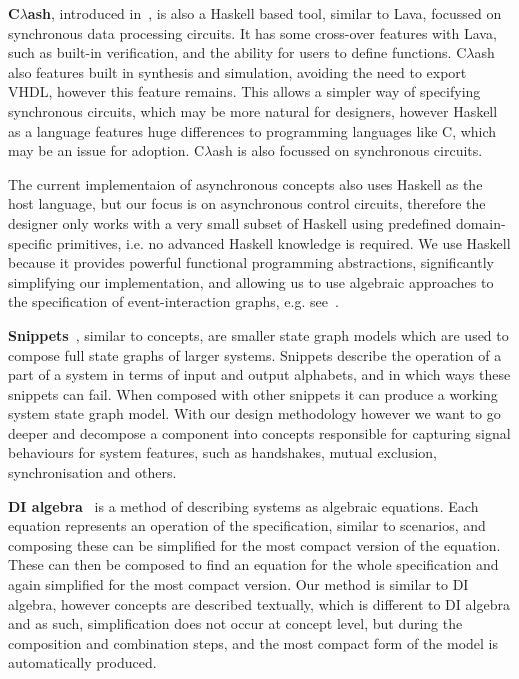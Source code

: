 \documentclass[british, journal]{IEEEtran}
\newcommand{\noun}[1]{\textsc{#1}}
\begin{document}
\textbf{C$\lambda$ash}, introduced in~\cite{baaij2009clambdaash},  is also a Haskell
based tool, similar to Lava, focussed on synchronous data processing circuits. It has some
cross-over features with Lava, such as built-in verification, and the ability for
users to define functions.
C$\lambda$ash also features built in synthesis and simulation, avoiding the need to export VHDL, however this feature remains. This allows a simpler way of
specifying synchronous circuits, which may be more natural for designers,
however Haskell as a language features huge differences to programming languages
like \noun{C}, which may be an issue for adoption. C$\lambda$ash is also focussed on synchronous circuits.

The current implementaion of asynchronous concepts also uses Haskell as the host language, but our focus is
on asynchronous control circuits, therefore the designer only works with a very small subset of Haskell using predefined
domain-specific primitives, i.e. no advanced Haskell knowledge is required. We use Haskell because it provides
powerful functional programming abstractions, significantly simplifying our implementation, and allowing us to use
algebraic approaches to the specification of event-interaction graphs, e.g. see~\cite{2017_mokhov_alga}.

\textbf{Snippets}~\cite{raey}, similar to concepts, are smaller
state graph models which are used to compose full state graphs of
larger systems. Snippets describe the operation of a part of a system
in terms of input and output alphabets, and in which ways these snippets
can fail. When composed with other snippets it can produce a working
system state graph model. With our design methodology however we want
to go deeper and decompose a component into concepts responsible for
capturing signal behaviours for system features, such as handshakes,
mutual exclusion, synchronisation and others.

\textbf{DI algebra}~\cite{josephs1993overview} is a method of describing
systems as algebraic equations. Each equation represents an operation
of the specification, similar to scenarios, and composing these can
be simplified for the most compact version of the equation. These
can then be composed to find an equation for the whole specification
and again simplified for the most compact version. Our method is similar
to DI algebra, however concepts are described textually, which is
different to DI algebra and as such, simplification does not occur
at concept level, but during the composition and combination steps,
and the most compact form of the model is automatically produced.
\end{document}
